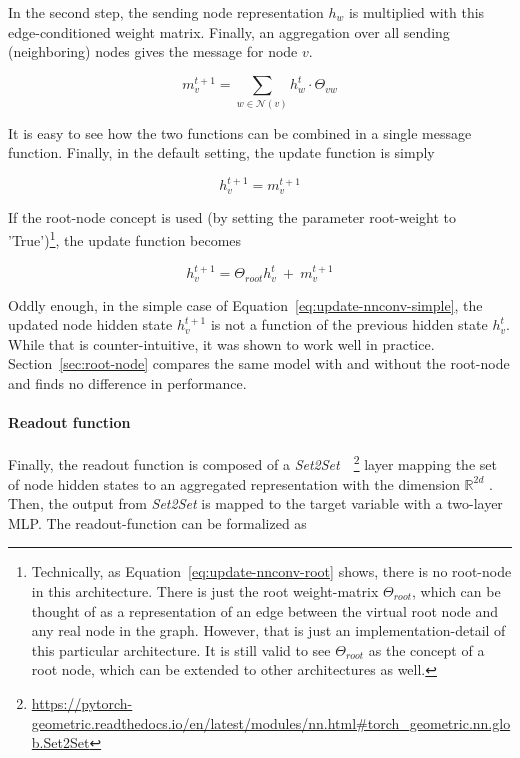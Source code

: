 In the second step, the sending node representation $h_w$ is multiplied with this edge-conditioned weight matrix. Finally, an aggregation over all sending (neighboring) nodes gives the message for node $v$.

\begin{equation}
 m_v^{t+1} = \sum_{w \in \mathcal{N}(v)} h_w^t \cdot \Theta_{vw}
\end{equation}

It is easy to see how the two functions can be combined in a single message function. Finally, in the default setting, the update function is simply

\begin{equation}\label{eq:update-nnconv-simple}
	h_v^{t+1} = m_v^{t+1}
\end{equation}

If the root-node concept is used (by setting the parameter root-weight to 'True')\footnote{
	Technically, as Equation~\ref{eq:update-nnconv-root} shows, there is no root-node in this architecture. There is just the root weight-matrix $\Theta_{root}$, which can be thought of as a representation of an edge between the virtual root node and any real node in the graph. However, that is just an implementation-detail of this particular architecture. It is still valid to see $\Theta_{root}$ as the concept of a root node, which can be extended to other architectures as well.
}, the update function becomes

\begin{equation}\label{eq:update-nnconv-root}
h_v^{t+1} = \Theta_{root}h_v^t~+~m_v^{t+1}
\end{equation}



Oddly enough, in the simple case of Equation~\ref{eq:update-nnconv-simple}, the updated node hidden state $h_v^{t+1}$ is not a function of the previous hidden state $h_v^t$. While that is counter-intuitive, it was shown to work well in practice. Section~\ref{sec:root-node} compares the same model with and without the root-node and finds no difference in performance.

\paragraph{Readout function} Finally, the readout function is composed of a \textit{Set2Set}~\cite{Vinyals2015}~\footnote{\url{https://pytorch-geometric.readthedocs.io/en/latest/modules/nn.html\#torch_geometric.nn.glob.Set2Set}} layer mapping the set of node hidden states to an aggregated representation with the dimension $\mathbb{R}^{2d}$
. Then, the output from \textit{Set2Set} is mapped to the target variable with a two-layer MLP. The readout-function can be formalized as

